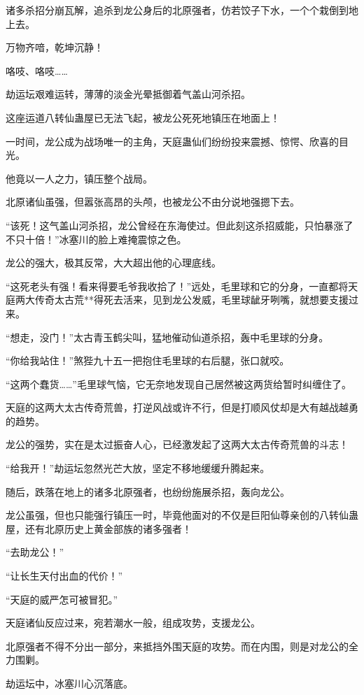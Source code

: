 \begin{this_body}
诸多杀招分崩瓦解，追杀到龙公身后的北原强者，仿若饺子下水，一个个栽倒到地上去。

万物齐喑，乾坤沉静！

咯吱、咯吱……

劫运坛艰难运转，薄薄的淡金光晕抵御着气盖山河杀招。

这座运道八转仙蛊屋已无法飞起，被龙公死死地镇压在地面上！

一时间，龙公成为战场唯一的主角，天庭蛊仙们纷纷投来震撼、惊愕、欣喜的目光。

他竟以一人之力，镇压整个战局。

北原诸仙虽强，但嚣张高昂的头颅，也被龙公不由分说地强摁下去。

“该死！这气盖山河杀招，龙公曾经在东海使过。但此刻这杀招威能，只怕暴涨了不只十倍！”冰塞川的脸上难掩震惊之色。

龙公的强大，极其反常，大大超出他的心理底线。

“这死老头有强！看来得要毛爷我收拾了！”远处，毛里球和它的分身，一直都将天庭两大传奇太古荒**得死去活来，见到龙公发威，毛里球龇牙咧嘴，就想要支援过来。

“想走，没门！”太古青玉鹤尖叫，猛地催动仙道杀招，轰中毛里球的分身。

“你给我站住！”煞狴九十五一把抱住毛里球的右后腿，张口就咬。

“这两个蠢货……”毛里球气恼，它无奈地发现自己居然被这两货给暂时纠缠住了。

天庭的这两大太古传奇荒兽，打逆风战或许不行，但是打顺风仗却是大有越战越勇的趋势。

龙公的强势，实在是太过振奋人心，已经激发起了这两大太古传奇荒兽的斗志！

“给我开！”劫运坛忽然光芒大放，坚定不移地缓缓升腾起来。

随后，跌落在地上的诸多北原强者，也纷纷施展杀招，轰向龙公。

龙公虽强，但也只能强行镇压一时，毕竟他面对的不仅是巨阳仙尊亲创的八转仙蛊屋，还有北原历史上黄金部族的诸多强者！

“去助龙公！”

“让长生天付出血的代价！”

“天庭的威严怎可被冒犯。”

天庭诸仙反应过来，宛若潮水一般，组成攻势，支援龙公。

北原强者不得不分出一部分，来抵挡外围天庭的攻势。而在内围，则是对龙公的全力围剿。

劫运坛中，冰塞川心沉落底。


\end{this_body}
